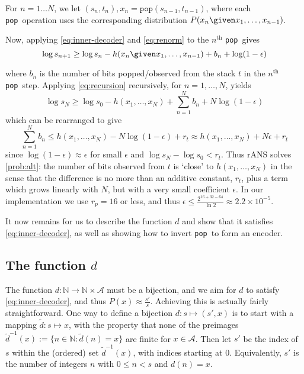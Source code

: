 \documentclass{article}
\theoremstyle{definition}
\newcommand{\pop}{\texttt{pop}}
\begin{document}
For \(n=1\ldots N\), we let \((s_n, t_n), x_n = \pop(s_{n-1}, t_{n-1})\), where
each \pop\ operation uses the corresponding distribution \(P(x_n\given
x_1,\ldots,x_{n-1})\).

Now, applying \cref{eq:inner-decoder} and \cref{eq:renorm} to the
\(n^\mathrm{th}\) \pop\ gives
\begin{equation}\label{eq:recursion}
  \log s_{n+1} \geq \log s_n - h(x_n\given x_1,\ldots,x_{n-1}) + b_n + \log (1
  - \epsilon)
\end{equation}

where \(b_n\) is the number of bits popped/observed from the stack \(t\) in the
\(n^{\mathrm{th}}\) \pop\ step. Applying \cref{eq:recursion} recursively, for
\(n=1,\ldots, N\), yields
\begin{equation}
  \log s_N \geq \log s_0 - h(x_1, \ldots, x_N) + \sum_{n=1}^{N} b_n +
  N\log(1-\epsilon)
\end{equation}
which can be rearranged to give
\begin{equation}
  \sum_{n=1}^Nb_n \leq h(x_1, \ldots, x_N) - N\log(1-\epsilon) + r_t
  \approx h(x_1, \ldots, x_N) + N\epsilon + r_t
\end{equation}
since \(\log(1 - \epsilon)\approx\epsilon\) for small \(\epsilon\) and \(\log
s_N - \log s_0 < r_t\). Thus rANS solves \cref{prob:alt}: the number of bits
observed from \(t\) is `close' to \(h(x_1,\ldots,x_N)\) in the sense that the
difference is no more than an additive constant, \(r_t\), plus a term which
grows linearly with \(N\), but with a very small coefficient \(\epsilon\). In
our implementation we use \(r_p = 16\) or less, and thus \(\epsilon \leq
\frac{2^{16 + 32 - 64}}{\ln 2} \approx 2.2\times 10^{-5}\).

It now remains for us to describe the function \(d\) and show that it satisfies
\cref{eq:inner-decoder}, as well as showing how to invert \pop\ to form an
encoder.

\subsection{The function \(d\)}
The function \(d:\mathbb{N}\rightarrow\mathbb{N}\times\mathcal{A}\) must be a
bijection, and we aim for \(d\) to satisfy \cref{eq:inner-decoder}, and thus
\(P(x)\approx \frac{s'}{s}\).  Achieving this is actually fairly
straightforward.  One way to define a bijection \(d:s\mapsto(s', x)\) is to
start with a mapping \(\tilde d: s\mapsto x\), with the property that none of
the preimages \(\tilde d^{-1}(x):=\{n\in\mathbb{N}:\tilde d(n) = x\}\) are
finite for \(x\in\mathcal{A}\). Then let \(s'\) be the index of \(s\) within
the (ordered) set \(\tilde d^{-1}(x)\), with indices starting at \(0\).
Equivalently, \(s'\) is the number of integers \(n\) with \(0\leq n<s\) and
\(d(n) = x\).
\end{document}
